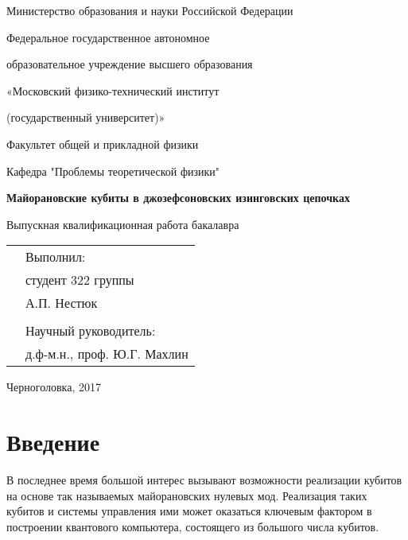 \documentclass[a4paper,12pt]{article}
\author{}
\title{}
\date{\today}
\theoremstyle{plain} %
\theoremstyle{definition} %
\theoremstyle{remark} %
\begin{document}
    
\begin{titlepage}
    \begin{center}
        Министерство образования и науки Российской Федерации
        \linebreak
        
        Федеральное государственное автономное
        
        образовательное учреждение высшего образования 
        
        «Московский физико-технический институт 
        
        (государственный университет)»
        \linebreak
        
        Факультет общей и прикладной физики
        
        Кафедра "Проблемы теоретической физики"
        \vspace{100pt}
        
        \textbf{\LARGE Майорановские кубиты в джозефсоновских изинговских цепочках}
        \linebreak
        
        Выпускная квалификационная работа бакалавра
     \end{center}
     \vspace{90pt}
     
     \begin{flushright}
         \begin{tabular}{cl}
         &Выполнил:\\
         &студент 322 группы\\         
         &А.П. Нестюк\\
         &\\
         &Научный руководитель:\\
         &д.ф-м.н., проф. Ю.Г. Махлин
        \end{tabular}
    \end{flushright}
    \vspace{60pt}
    
    \begin{center}
        Черноголовка, 2017
    \end{center}
 \end{titlepage}   

\tableofcontents
\pagebreak

\section{Введение}
В последнее время большой интерес вызывают возможности реализации кубитов на основе так называемых майорановских нулевых мод. Реализация таких кубитов и системы управления ими может оказаться ключевым фактором в построении квантового компьютера, состоящего из большого числа кубитов.
\end{document}
